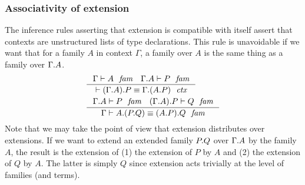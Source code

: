 \subsubsection{Associativity of extension}
\label{comp-ee}
The inference rules asserting that extension is compatible with itself assert
that contexts are unstructured lists of type declarations. This rule is
unavoidable if we want that for a family $A$ in context $\Gamma$, a family over
$A$ is the same thing as a family over $\ctxext{\Gamma}{A}$. 
\begin{align}
& \inference
  { \jfam{\Gamma}{A}
    \jfam{{\Gamma}{A}}{P}
    }
  { \jctxeq{\ctxext{{\Gamma}{A}}{P}}{\ctxext{\Gamma}{{A}{P}}}
    }
  \\
& \inference
  { \jfam{{\Gamma}{A}}{P}
    \jfam{{{\Gamma}{A}}{P}}{Q}
    }
  { \jfameq{\Gamma}{\ctxext{A}{{P}{Q}}}{\ctxext{{A}{P}}{Q}}
    }
  \label{comp-ee-c}
\end{align}
Note that we may take the point of view that extension distributes over
extensions. If we want to extend an extended family $\ctxext{P}{Q}$ over
$\ctxext{\Gamma}{A}$ by the family $A$, the result is the extension of (1)
the extension of $P$ by $A$ and (2) the extension of $Q$ by $A$. The latter is
simply $Q$ since extension acts trivially at the level of families (and terms).

